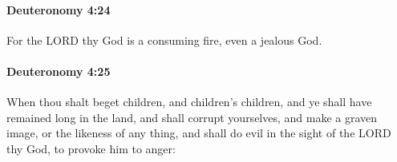 		\paragraph{Deuteronomy 4:24} %
			\label{DEUTERONOMY-4-24}

			For the LORD thy God is a consuming fire, even a jealous God.


		\paragraph{Deuteronomy 4:25} %
			\label{DEUTERONOMY-4-25}

			When thou shalt beget children, and children's children, and ye shall have remained long in the land, and shall corrupt yourselves, and make a graven image, or the likeness of any thing, and shall do evil in the sight of the LORD thy God, to provoke him to anger:


